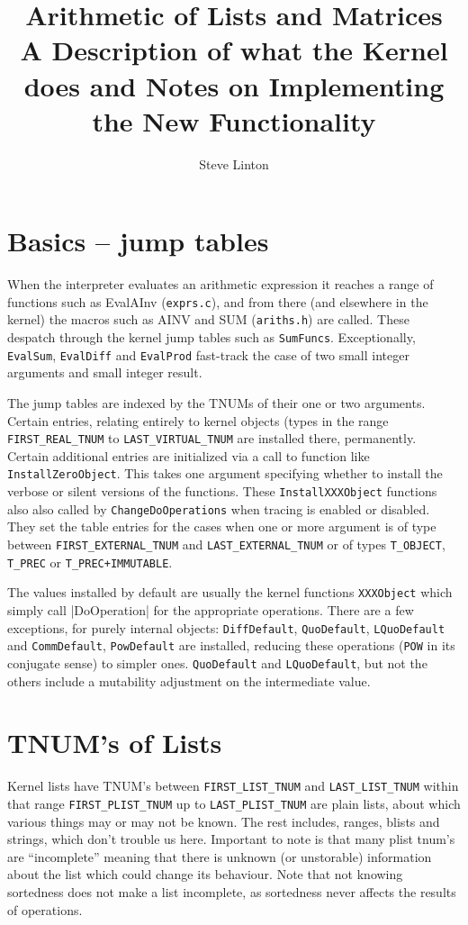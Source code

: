 \documentclass{article}
\title{Arithmetic of Lists and Matrices\\
A Description of what the Kernel does and Notes on Implementing the
New Functionality}
\author{Steve Linton}
\begin{document}
\maketitle
\section{Basics -- jump tables}

When the interpreter evaluates an arithmetic expression it reaches a
range of functions such as EvalAInv (\verb|exprs.c|), and from there
(and elsewhere in the kernel) the macros such as AINV and SUM
(\verb|ariths.h|) are called. These despatch through the kernel jump
tables such as \verb|SumFuncs|. Exceptionally, \verb|EvalSum|, \verb|EvalDiff| and
\verb|EvalProd| fast-track the case of two small integer arguments and
small integer result. 

The jump tables  are indexed by the TNUMs of their
one or two arguments. Certain entries, relating entirely to kernel
objects (types in the range \verb|FIRST_REAL_TNUM| to
\verb|LAST_VIRTUAL_TNUM| are installed there, permanently. 
Certain additional entries are initialized via a call to function like
\verb|InstallZeroObject|. This takes one argument specifying whether
to install the verbose or silent versions of the functions. These
\verb|InstallXXXObject| functions also also called by
\verb|ChangeDoOperations| when tracing is enabled or disabled. They
set the table entries for the cases when one or more argument  is of
type between \verb|FIRST_EXTERNAL_TNUM| and \verb|LAST_EXTERNAL_TNUM|
or of types \verb|T_OBJECT|, \verb|T_PREC| or \verb|T_PREC+IMMUTABLE|.


The values installed by default are usually the kernel functions
\verb|XXXObject| which simply call |DoOperation| for the appropriate
operations. There are a few exceptions, for purely internal objects:
\verb|DiffDefault|, \verb|QuoDefault|, \verb|LQuoDefault| and
\verb|CommDefault|, \verb|PowDefault|  are installed, reducing these
operations (\verb|POW| in its conjugate sense) to simpler
ones. \verb|QuoDefault| and \verb|LQuoDefault|, but not the others
include a mutability adjustment on the intermediate value.

\section{TNUM's of Lists}

Kernel lists have TNUM's between \verb|FIRST_LIST_TNUM| and
\verb|LAST_LIST_TNUM| within that range \verb|FIRST_PLIST_TNUM| up to
\verb|LAST_PLIST_TNUM| are plain lists, about which various things may
or may not be known. The rest includes, ranges, blists and strings,
which don't trouble us here.  Important to note is that many plist
tnum's are ``incomplete'' meaning that there is unknown (or
unstorable) information about the list which could change its
behaviour. Note that not knowing sortedness does not make a list
incomplete, as sortedness never affects the results of operations.
\end{document}
